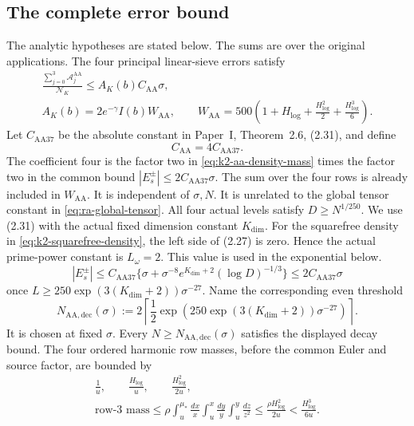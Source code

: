 \subsection{The complete error bound}

The analytic hypotheses are stated below.
The sums are over the original applications.
The four principal linear-sieve errors satisfy
\begin{equation}\label{eq:k2-aa-mass}
\begin{gathered}
 \frac{\sum_{j=0}^3 \mathcal A_j^{\mathrm{AA}}}{\mathcal N_K}
 \le A_K(b)C_{\mathrm{AA}}\sigma,\\
 A_K(b)=2e^{-\gamma}I(b)W_{\mathrm{AA}},\qquad
 W_{\mathrm{AA}}=500\left(1+H_{\log}
                    +\frac{H_{\log}^2}2+\frac{H_{\log}^3}6\right).
\end{gathered}
\end{equation}
Let \(C_{\mathrm{AA37}}\) be the absolute constant in Paper~I,
Theorem~2.6, (2.31), and define
\begin{equation}\label{eq:k2-aa-constant}
 C_{\mathrm{AA}}=4C_{\mathrm{AA37}}.
\end{equation}
The coefficient four is the factor two in
\eqref{eq:k2-aa-density-mass} times the factor two in the common bound
\(|E_s^{\pm}|\le 2C_{\mathrm{AA37}}\sigma\). The sum over the four rows is
already included in \(W_{\mathrm{AA}}\). It is independent of \(\sigma,N\).
It is unrelated to the global tensor constant in
\eqref{eq:ra-global-tensor}. All four actual levels satisfy
\(D\ge N^{1/250}\). We use (2.31) with the actual fixed dimension constant
\(K_{\mathrm{dim}}\). For the squarefree density in
\eqref{eq:k2-squarefree-density}, the left side of (2.27) is zero. Hence
the actual prime-power constant is \(L_{\omega}=2\). This value is used
in the exponential below.
\begin{equation}\label{eq:k2-aa-decay}
 |E_s^{\pm}|\le C_{\mathrm{AA37}}
 \{\sigma+\sigma^{-8}e^{K_{\mathrm{dim}}+2}(\log D)^{-1/3}\}
 \le2C_{\mathrm{AA37}}\sigma
\end{equation}
once \(L\ge250\exp(3(K_{\mathrm{dim}}+2))\sigma^{-27}\).
Name the corresponding even threshold
\[
 N_{\mathrm{AA,dec}}(\sigma)
 :=2\left\lceil\frac12
 \exp\!\left(250\exp(3(K_{\mathrm{dim}}+2))\sigma^{-27}\right)
 \right\rceil.
\]
It is chosen at fixed \(\sigma\). Every
\(N\ge N_{\mathrm{AA,dec}}(\sigma)\) satisfies the displayed decay bound.
The four ordered harmonic row masses, before the common Euler and source
factor, are bounded by
\begin{equation}\label{eq:k2-aa-row-masses}
\begin{gathered}
 \frac1u,\qquad \frac{H_{\log}}u,\qquad
 \frac{H_{\log}^2}{2u},\\
 \text{row-3 mass}\le
 \rho\int_u^{\mu_*}\frac{dx}{x}\int_u^x\frac{dy}{y}
        \int_u^y\frac{dz}{z^2}
 \le\frac{\rho H_{\log}^2}{2u}
 <\frac{H_{\log}^3}{6u}.
\end{gathered}
\end{equation}
